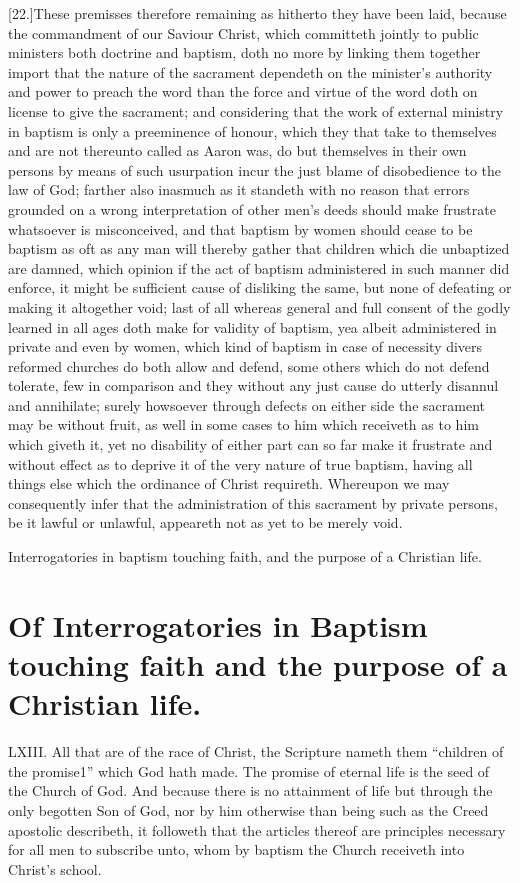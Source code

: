 [22.]These premisses therefore remaining as hitherto they have been laid, because the commandment of our Saviour Christ, which committeth jointly to public ministers both doctrine and baptism, doth no more by linking them together import that the nature of the sacrament dependeth on the minister’s authority and power to preach the word than the force and virtue of the word doth on license to give the sacrament; and considering that the work of external ministry in baptism is only a preeminence of honour, which they that take to themselves and are not thereunto called as Aaron was, do but themselves in their own persons by means of such usurpation incur the just blame of disobedience to the law of God; farther also inasmuch as it standeth with no  reason that errors grounded on a wrong interpretation of other men’s deeds should make frustrate whatsoever is misconceived,
 and that baptism by women should cease to be baptism as oft as any man will thereby gather that children which die unbaptized are damned, which opinion if the act of baptism administered in such manner did enforce, it might be sufficient cause of disliking the same, but none of defeating or making it altogether void; last of all whereas general and full consent of the godly learned in all ages doth make for validity of baptism, yea albeit administered in private and even by women, which kind of baptism in case of necessity divers reformed churches do both allow and defend, some others which do not defend tolerate, few in comparison and they without any just cause do utterly disannul and annihilate; surely howsoever through defects on either side the sacrament may be without fruit, as well in some cases to him which receiveth as to him which giveth it, yet no disability of either part can so far make it frustrate and without effect as to deprive it of the very nature of true baptism, having all things else which the ordinance of Christ requireth. Whereupon we may consequently infer that the administration of this sacrament by private persons, be it lawful or unlawful, appeareth not as yet to be merely void.


Interrogatories in baptism touching faith, and the purpose of a Christian life.
\section*{Of Interrogatories in Baptism touching faith and the purpose of a Christian life.}
LXIII. All that are of the race of Christ, the Scripture nameth them “children of the promise1” which God hath made. The promise of eternal life is the seed of the Church of God. And because there is no attainment of life but through the only begotten Son of God, nor by him otherwise than being such as the Creed apostolic describeth, it followeth that the articles thereof are principles necessary for all men to subscribe unto, whom by baptism the Church receiveth into Christ’s school.

